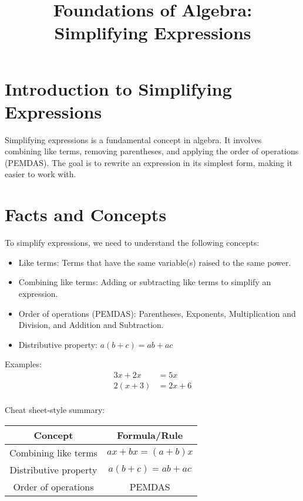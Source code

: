 \documentclass{article}
\title{Foundations of Algebra: Simplifying Expressions}
\author{}
\date{}
\begin{document}
\maketitle

\section{Introduction to Simplifying Expressions}
Simplifying expressions is a fundamental concept in algebra. It involves combining like terms, removing parentheses, and applying the order of operations (PEMDAS). The goal is to rewrite an expression in its simplest form, making it easier to work with.

\section{Facts and Concepts}
To simplify expressions, we need to understand the following concepts:
\begin{itemize}
\item Like terms: Terms that have the same variable(s) raised to the same power.
\item Combining like terms: Adding or subtracting like terms to simplify an expression.
\item Order of operations (PEMDAS): Parentheses, Exponents, Multiplication and Division, and Addition and Subtraction.
\item Distributive property: $a(b + c) = ab + ac$
\end{itemize}

Examples:
\begin{align*}
3x + 2x &= 5x \\
2(x + 3) &= 2x + 6 \\
\end{align*}

Cheat sheet-style summary:
\begin{center}
\begin{tabular}{|c|c|}
\hline Concept & Formula/Rule \\
\hline Combining like terms & $ax + bx = (a + b)x$ \\
\hline Distributive property & $a(b + c) = ab + ac$ \\
\hline Order of operations & PEMDAS \\
\hline
\end{tabular}
\end{center}
\end{document}
